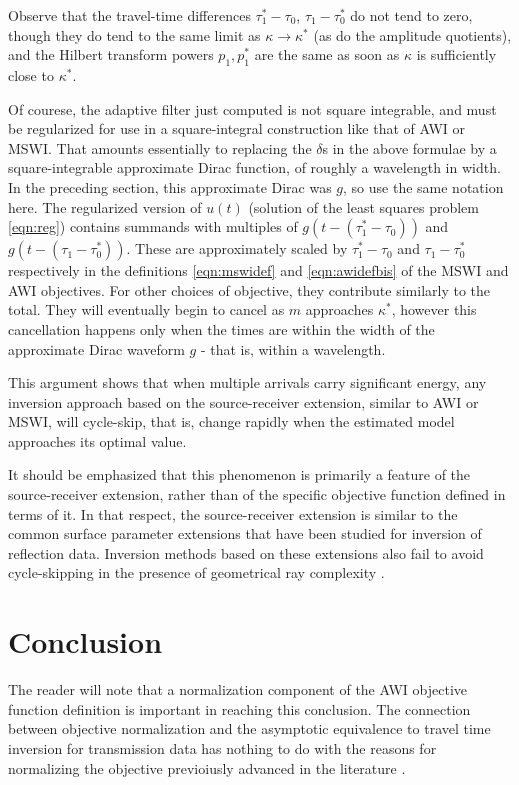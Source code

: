 Observe that the travel-time differences $\tau^*_1-\tau_0$,
$\tau_1-\tau_0^*$ do not tend to zero, though they do tend to the same
limit as $\kappa \rightarrow \kappa^*$ (as do the amplitude quotients), and the
Hilbert transform powers $p_1, p_1^*$ are the same as soon as $\kappa$ is
sufficiently close to $\kappa^*$.

Of courese, the adaptive filter just computed is not square
integrable, and must be regularized for use in a square-integral
construction like that of AWI or MSWI. That amounts essentially to
replacing the $\delta$s in the above formulae by a square-integrable
approximate Dirac function, of roughly a wavelength in width. In the
preceding section, this approximate Dirac was $g$, so use the same
notation here. The regularized version of $u(t)$ (solution of the
least squares problem \ref{eqn:reg}) contains summands with multiples of $g(t-(\tau^*_1-\tau_0))$
and $g(t-(\tau_1-\tau^*_0))$. These are approximately scaled by
$\tau^*_1-\tau_0$ and $\tau_1-\tau^*_0$ respectively in the
definitions \ref{eqn:mswidef} and \ref{eqn:awidefbis} of the MSWI and AWI
objectives. For other choices of objective, they contribute similarly
to the total. They will eventually begin to cancel as $m$ approaches
$\kappa^*$, however this cancellation happens only when the times are
within the width of the approximate 
Dirac waveform $g$ - that is, within a wavelength.

This argument shows that when multiple arrivals carry significant energy, any
inversion approach based on the source-receiver extension, similar to
AWI or MSWI, will cycle-skip, that is, change rapidly when the
estimated model approaches its optimal value.

It should be emphasized that this phenomenon is primarily a feature of the
source-receiver extension, rather than of the specific objective
function defined in terms of it. In that respect, the source-receiver
extension is similar to the common surface parameter extensions that
have been studied for inversion of reflection data. Inversion methods
based on these extensions also fail to avoid cycle-skipping in the presence of
geometrical ray complexity \cite[]{geoprosp:2008}.

\section{Conclusion}

The reader will
note that a normalization component of the AWI objective function
definition is important in reaching this conclusion. The connection
between objective normalization and the asymptotic equivalence to
travel time inversion for transmission data has nothing to do with the
reasons for normalizing the objective previoiusly advanced in the
literature \cite[]{Warner:16,LiAlkhalifah:21}.


